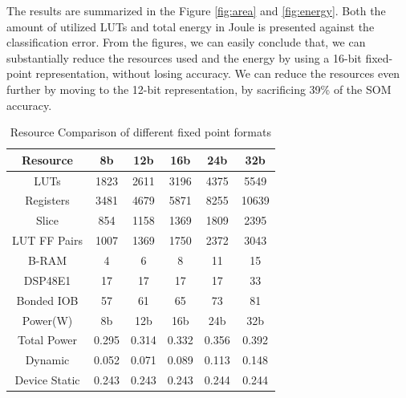 \documentclass[a4paper,10pt]{article}
\begin{document}
The results are summarized in the Figure \ref{fig:area} and \ref{fig:energy}. Both the amount of utilized LUTs and total energy in Joule is presented against the classification error. From the figures, we can easily conclude that, we can substantially reduce the resources used and the energy by using a 16-bit fixed-point representation, without losing accuracy. We can reduce the resources even further by moving to the 12-bit representation, by sacrificing 39\% of the SOM accuracy. 
\begin{table}[h!]
	\centering
	\caption{Resource Comparison of different fixed point formats}
	\label{table:1}
	\begin{tabular}{ c |c | c| c |c | c } 
		\toprule
		Resource & 8b & 12b & 16b & 24b & 32b \\ 
		\midrule
		LUTs & 1823 & 2611 &3196 & 4375 & 5549 \\
		\hline
		Registers & 3481 & 4679 & 5871 & 8255 & 10639 \\ 
		\hline
		Slice & 854 & 1158 & 1369 &1809 & 2395 \\ 
		\hline
		LUT FF Pairs & 1007 & 1369 & 1750 & 2372 & 3043 \\
		\hline
		B-RAM & 4 & 6 & 8 & 11 & 15 \\
		\hline
		DSP48E1 & 17 & 17 & 17 & 17 & 33 \\
		\hline
		Bonded IOB & 57 & 61 & 65 & 73 & 81 \\
		\midrule
	
		\midrule
		Power(W) & 8b & 12b & 16b & 24b & 32b \\ 
		\midrule
		Total Power & 0.295 &0.314 &0.332 &0.356 &0.392 \\
		\hline
		Dynamic &0.052 &0.071 &0.089 &0.113 &0.148 \\ 
		\hline
		Device Static &0.243 &0.243 &0.243 &0.244 &0.244 \\ 
		\bottomrule
	\end{tabular}
\end{table}
\end{document}
